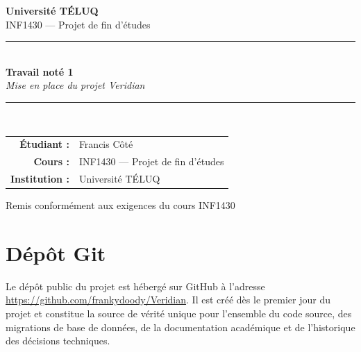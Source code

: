 \documentclass[12pt, a4paper]{article}
\begin{document}
\begin{titlepage}
  \centering
  \vspace*{2cm}

  {\Large \textbf{Université TÉLUQ}}\\[0.5cm]
  {\large INF1430 — Projet de fin d'études}\\[3cm]

  \rule{\linewidth}{0.5pt}\\[0.4cm]
  {\LARGE \textbf{Travail noté 1}}\\[0.3cm]
  {\Large \textit{Mise en place du projet Veridian}}\\[0.3cm]
  \rule{\linewidth}{0.5pt}\\[3cm]

  \begin{tabular}{rl}
    \textbf{Étudiant :}    & Francis Côté \\[0.3cm]
    \textbf{Cours :}       & INF1430 — Projet de fin d'études \\[0.3cm]
    \textbf{Institution :} & Université TÉLUQ \\[0.3cm]
  \end{tabular}

  \vfill
  {\small Remis conformément aux exigences du cours INF1430}
\end{titlepage}

\newpage
\tableofcontents
\newpage

\section{Dépôt Git}

Le dépôt public du projet est hébergé sur GitHub à l'adresse
\url{https://github.com/frankydoody/Veridian}. Il est créé
dès le premier jour du projet et constitue la source de vérité
unique pour l'ensemble du code source, des migrations de base
de données, de la documentation académique et de l'historique
des décisions techniques.
\end{document}
